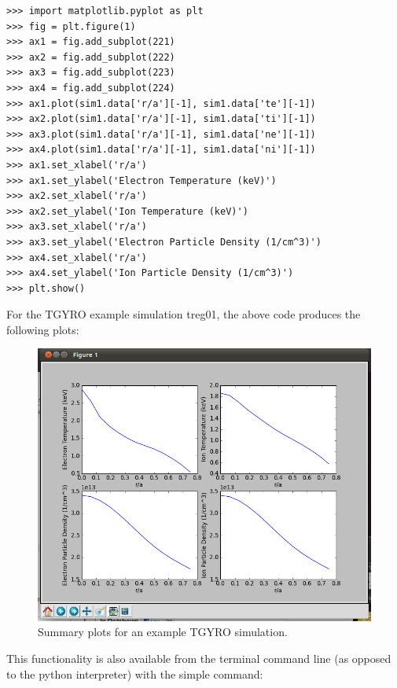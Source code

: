 \documentclass{article}
\begin{document}
\addtolength{\parskip}{-\baselineskip}

\begin{verbatim}
>>> import matplotlib.pyplot as plt
>>> fig = plt.figure(1)
>>> ax1 = fig.add_subplot(221)
>>> ax2 = fig.add_subplot(222)
>>> ax3 = fig.add_subplot(223)
>>> ax4 = fig.add_subplot(224)
>>> ax1.plot(sim1.data['r/a'][-1], sim1.data['te'][-1])
>>> ax2.plot(sim1.data['r/a'][-1], sim1.data['ti'][-1])
>>> ax3.plot(sim1.data['r/a'][-1], sim1.data['ne'][-1])
>>> ax4.plot(sim1.data['r/a'][-1], sim1.data['ni'][-1])
>>> ax1.set_xlabel('r/a')
>>> ax1.set_ylabel('Electron Temperature (keV)')
>>> ax2.set_xlabel('r/a')
>>> ax2.set_ylabel('Ion Temperature (keV)')
>>> ax3.set_xlabel('r/a')
>>> ax3.set_ylabel('Electron Particle Density (1/cm^3)')
>>> ax4.set_xlabel('r/a')
>>> ax4.set_ylabel('Ion Particle Density (1/cm^3)')
>>> plt.show()
\end{verbatim}
\addtolength{\parskip}{\baselineskip}
\fontfamily{\rmdefault}\selectfont

\noindent For the TGYRO example simulation treg01, the above code produces the following plots:

\begin{figure}[h!]
  \centering
    \includegraphics[scale=.5]{pssht1.png}
  \caption{Summary plots for an example TGYRO simulation.}
\end{figure}

\noindent This functionality is also available from the terminal command line (as opposed to the python interpreter) with the simple command:
\end{document}

